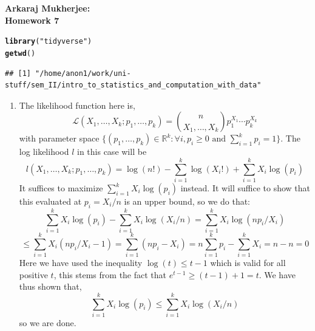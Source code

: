 \documentclass[12pt,a4paper]{article}\usepackage[]{graphicx}\usepackage[]{xcolor}
\makeatletter
\newcommand{\hlsng}[1]{\textcolor[rgb]{0.192,0.494,0.8}{#1}}%
\newcommand{\hldef}[1]{\textcolor[rgb]{0.345,0.345,0.345}{#1}}%
\newcommand{\hlkwd}[1]{\textcolor[rgb]{0.737,0.353,0.396}{\textbf{#1}}}%
\newenvironment{kframe}{%
 \def\at@end@of@kframe{}%
 \ifinner\ifhmode%
  \def\at@end@of@kframe{\end{minipage}}%
  \begin{minipage}{\columnwidth}%
 \fi\fi%
 \def\FrameCommand##1{\hskip\@totalleftmargin \hskip-\fboxsep
 \colorbox{shadecolor}{##1}\hskip-\fboxsep
     \hskip-\linewidth \hskip-\@totalleftmargin \hskip\columnwidth}%
 \MakeFramed {\advance\hsize-\width
   \@totalleftmargin\z@ \linewidth\hsize
   \@setminipage}}%
 {\par\unskip\endMakeFramed%
 \at@end@of@kframe}
\newenvironment{knitrout}{}{} %
\makeatother
\begin{document}
{\bf Arkaraj Mukherjee: } \\
{\bf Homework 7}
\\
\begin{knitrout}
\color{fgcolor}\begin{kframe}
\begin{alltt}
\hlkwd{library}\hldef{(}\hlsng{"tidyverse"}\hldef{)}
\hlkwd{getwd}\hldef{()}
\end{alltt}
\begin{verbatim}
## [1] "/home/anon1/work/uni-stuff/sem_II/intro_to_statistics_and_computation_with_data"
\end{verbatim}
\end{kframe}
\end{knitrout}

\begin{enumerate}[label=\arabic*.]
    \item The likelihood function here is,
        $$\mathcal L(X_1,\ldots,X_k;p_1,\ldots,p_k)=\binom{n}{X_1,\ldots,X_k}p_1^{X_1}\cdots p_k^{X_k}$$
    with parameter space $\{(p_1,\ldots,p_k)\in\mathbb{R}^k:\forall i, p_i\geq 0\text{ and }\sum_{i=1}^k p_i=1\}$.
    The log likelihood $l$ in this case will be
    $$l(X_1,\ldots,X_k;p_1,\ldots,p_k)=\log(n!)-\sum_{i=1}^k\log(X_i!) + \sum_{i=1}^k X_i\log(p_i)$$
    It suffices to maximize $\sum_{i=1}^k X_i\log(p_i)$ instead.
    It will suffice to show that this evaluated at $p_i=X_i/n$ is an upper bound, so we do that:
    $$\sum_{i=1}^k X_i\log(p_i)-\sum_{i=1}^k X_i\log(X_i/n)=\sum_{i=1}^k X_i\log(n p_i/X_i)$$
    $$\leq\sum_{i=1}^k X_i(n p_i/X_i-1)=\sum_{i=1}^k (n p_i-X_i)=n\sum_{i=1}^k p_i-\sum_{i=1}^k X_i=n-n=0$$
    Here we have used the inequality $\log(t)\leq t-1$ which is valid for all positive $t$, this stems from the fact that $e^{t-1}\geq(t-1)+1=t$.
    We have thus shown that,
    $$\sum_{i=1}^k X_i\log(p_i)\leq\sum_{i=1}^k X_i\log(X_i/n)$$
    so we are done.


\end{enumerate}
\end{document}
